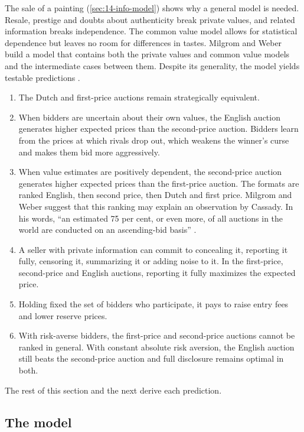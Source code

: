 The sale of a painting (\cref{sec:14-info-model}) shows why a general model is needed. Resale, prestige and
doubts about authenticity break private values, and related information breaks independence. The common
value model allows for statistical dependence but leaves no room for differences in tastes. Milgrom and Weber
build a model that contains both the private values and common value models and the intermediate cases
between them. Despite its generality, the model yields testable predictions
\citep[pp.~1095--1097]{MilgromWeber1982}.
\begin{enumerate}[label=(\roman*)]
  \item The Dutch and first-price auctions remain strategically equivalent.
  \item When bidders are uncertain about their own values, the English auction generates higher expected
  prices than the second-price auction. Bidders learn from the prices at which rivals drop out, which
  weakens the winner's curse and makes them bid more aggressively.
  \item When value estimates are positively dependent, the second-price auction generates higher expected
  prices than the first-price auction. The formats are ranked English, then second price, then Dutch and
  first price. Milgrom and Weber suggest that this ranking may explain an observation by Cassady. In his
  words, ``an estimated 75 per cent, or even more, of all auctions in the world are conducted on an
  ascending-bid basis'' \citep[p.~66, quoted in Milgrom and Weber 1982, p.~1095]{Cassady1967}.
  \item A seller with private information can commit to concealing it, reporting it fully, censoring it,
  summarizing it or adding noise to it. In the first-price, second-price and English auctions, reporting it
  fully maximizes the expected price.
  \item Holding fixed the set of bidders who participate, it pays to raise entry fees and lower reserve
  prices.
  \item With risk-averse bidders, the first-price and second-price auctions cannot be ranked in general. With
  constant absolute risk aversion, the English auction still beats the second-price auction and full
  disclosure remains optimal in both.
\end{enumerate}
The rest of this section and the next derive each prediction.

\subsection{The model}\label{sec:14-mw-model}

